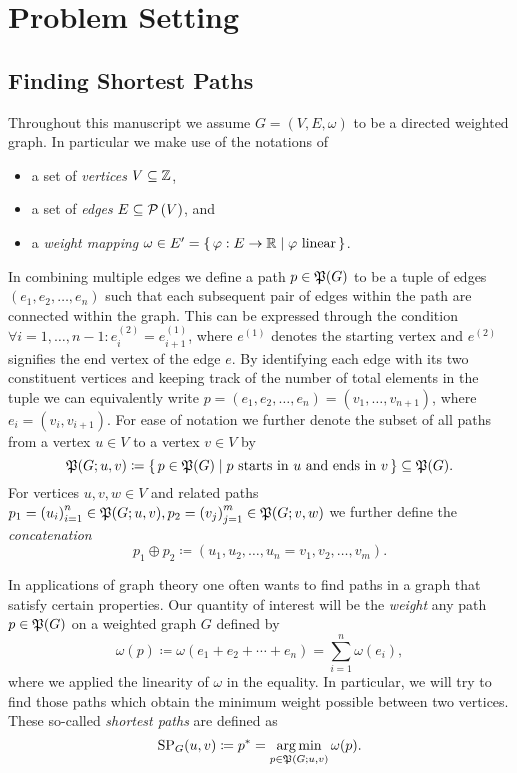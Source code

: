 \chapter{Problem Setting}\label{chap:problem-setting}

\section{Finding Shortest Paths}

Throughout this manuscript we assume $G = (V, E, \omega)$ to be a directed weighted graph.
In particular we make use of the notations of
\begin{itemize}
    \item a set of \emph{vertices} $V \subseteq \mathbb{Z}$,
    \item a set of \emph{edges} $E \subseteq \mathcal{P}\left(V\right)$, and
    \item a \emph{weight mapping} $\omega \in E' = \left\{\,\varphi: E \rightarrow \mathbb{R}\mid\text{$\varphi$ linear}\,\right\}$.
\end{itemize}
In combining multiple edges we define a path $p \in \mathfrak{P}(G)$ to be a tuple of edges $(e_1, e_2, \dots, e_n)$ such that each subsequent pair of edges within the path are connected within the graph.
This can be expressed through the condition $\forall i = 1, \dots, n - 1: e_i^{(2)} = e_{i + 1}^{(1)}$, where $e^{(1)}$ denotes the starting vertex and $e^{(2)}$ signifies the end vertex of the edge $e$.
By identifying each edge with its two constituent vertices and keeping track of the number of total elements in the tuple we can equivalently write $p = (e_1, e_2, \dots, e_n) = (v_1, \dots, v_{n + 1})$, where $e_i = (v_i, v_{i + 1})$.
For ease of notation we further denote the subset of all paths from a vertex $u \in V$ to a vertex $v \in V$ by
\[
    \mathfrak{P}(G; u, v) \coloneqq \left\{\,p \in \mathfrak{P}(G)\mid\text{$p$ starts in $u$ and ends in $v$}\,\right\} \subseteq \mathfrak{P}(G).
\]
For vertices $u, v, w \in V$ and related paths $p_1 = {(u_i)}_{i = 1}^n \in \mathfrak{P}(G; u, v), p_2 = {(v_j)}_{j = 1}^m \in \mathfrak{P}(G; v, w)$ we further define the \emph{concatenation}
\[
    p_1 \oplus p_2 \coloneqq (u_1, u_2, \dots, u_n = v_1, v_2, \dots, v_m).
\]

In applications of graph theory one often wants to find paths in a graph that satisfy certain properties.
Our quantity of interest will be the \emph{weight} any path $p \in \mathfrak{P}(G)$ on a weighted graph $G$ defined by
\[
    \omega(p) \coloneqq \omega\left( e_1 + e_2 + \cdots + e_n \right) = \sum\limits_{i = 1}^n \omega(e_i),
\]
where we applied the linearity of $\omega$ in the equality.
In particular, we will try to find those paths which obtain the minimum weight possible between two vertices.
These so-called \emph{shortest paths} are defined as
\[
    \operatorname{SP}_G(u, v) \coloneqq p^* = \operatorname*{arg\,min}\limits_{p \in \mathfrak{P}(G; u, v)} \omega(p).
\]

